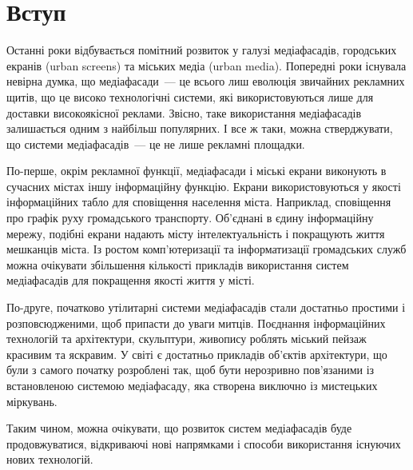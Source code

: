 \documentclass[a4paper,ukrainian,utf8,nocolumnsxix,floatsection,equationsection]{eskdtext}
\newcommand{\sectionnonum}[1]{\section*{#1}\addcontentsline{toc}{section}{#1}}
\begin{document}


{}






\tableofcontents


\sectionnonum{Вступ}
\label{sec:intro}

Останні роки відбувається помітний розвиток у галузі медіафасадів, городських екранів (urban screens) та міських медіа (urban media). Попередні роки існувала невірна думка, що медіафасади~--- це всього лиш еволюція звичайних рекламних щитів, що це високо технологічні системи, які використовуються лише для доставки високоякісної реклами. Звісно, таке використання медіафасадів залишається одним з найбільш популярних. І все ж таки, можна стверджувати, що системи медіафасадів~--- це не лише рекламні площадки. 

По-перше, окрім рекламної функції, медіафасади і міські екрани виконують в сучасних містах іншу інформаційну функцію. Екрани використовуються у якості інформаційних табло для сповіщення населення міста. Наприклад, сповіщення про графік руху громадського транспорту. Об’єднані в єдину інформаційну мережу, подібні екрани надають місту інтелектуальність і покращують життя мешканців міста. Із ростом комп’ютеризації та інформатизації громадських служб можна очікувати збільшення кількості прикладів використання систем медіафасадів для покращення якості життя у місті.

По-друге, початково утілитарні системи медіафасадів стали достатньо простими і розповсюдженими, щоб припасти до уваги митців. Поєднання інформаційних технологій та архітектури, скульптури, живопису роблять міський пейзаж красивим та яскравим. У світі є достатньо прикладів об’єктів архітектури, що були з самого початку розроблені так, щоб бути нерозривно пов’язаними із встановленою системою медіафасаду, яка створена виключно із мистецьких міркувань. 

Таким чином, можна очікувати, що розвиток систем медіафасадів буде продовжуватися, відкриваючі нові напрямками і способи використання існуючих нових технологій. 
\end{document}
